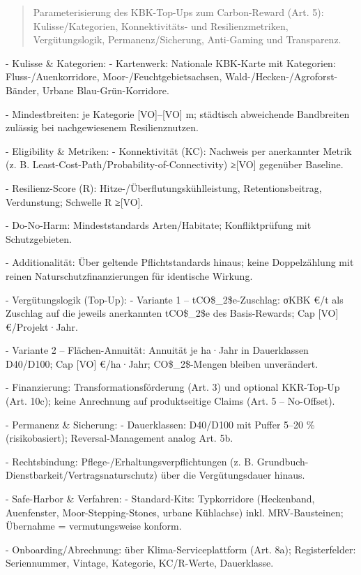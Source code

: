 \documentclass[12pt,a4paper]{scrartcl}
\begin{document}
\begin{quote}
Parameterisierung des KBK-Top-Ups zum Carbon-Reward (Art. 5): Kulisse/Kategorien, Konnektivitäts- und Resilienzmetriken, Vergütungslogik, Permanenz/Sicherung, Anti-Gaming und Transparenz.
\end{quote}

- Kulisse \& Kategorien:
- Kartenwerk: Nationale KBK-Karte mit Kategorien: Fluss-/Auenkorridore, Moor-/Feuchtgebietsachsen, Wald-/Hecken-/Agroforst-Bänder, Urbane Blau-Grün-Korridore.

- Mindestbreiten: je Kategorie [VO]--[VO] m; städtisch abweichende Bandbreiten zulässig bei nachgewiesenem Resilienznutzen.

- Eligibility \& Metriken:
- Konnektivität (KC): Nachweis per anerkannter Metrik (z. B. Least-Cost-Path/Probability-of-Connectivity) ≥[VO] gegenüber Baseline.

- Resilienz-Score (R): Hitze-/Überflutungskühlleistung, Retentionsbeitrag, Verdunstung; Schwelle R ≥[VO].

- Do-No-Harm: Mindeststandards Arten/Habitate; Konfliktprüfung mit Schutzgebieten.

- Additionalität: Über geltende Pflichtstandards hinaus; keine Doppelzählung mit reinen Naturschutzfinanzierungen für identische Wirkung.

- Vergütungslogik (Top-Up):
- Variante 1 -- tCO\$\_2\$e-Zuschlag: σKBK €/t als Zuschlag auf die jeweils anerkannten tCO\$\_2\$e des Basis-Rewards; Cap [VO] €/Projekt·Jahr.

- Variante 2 -- Flächen-Annuität: Annuität je ha·Jahr in Dauerklassen D40/D100; Cap [VO] €/ha·Jahr; CO\$\_2\$-Mengen bleiben unverändert.

- Finanzierung: Transformationsförderung (Art. 3) und optional KKR-Top-Up (Art. 10c); keine Anrechnung auf produktseitige Claims (Art. 5 -- No-Offset).

- Permanenz \& Sicherung:
- Dauerklassen: D40/D100 mit Puffer 5--20 \% (risikobasiert); Reversal-Management analog Art. 5b.

- Rechtsbindung: Pflege-/Erhaltungsverpflichtungen (z. B. Grundbuch-Dienstbarkeit/Vertragsnaturschutz) über die Vergütungsdauer hinaus.

- Safe-Harbor \& Verfahren:
- Standard-Kits: Typkorridore (Heckenband, Auenfenster, Moor-Stepping-Stones, urbane Kühlachse) inkl. MRV-Bausteinen; Übernahme = vermutungsweise konform.

- Onboarding/Abrechnung: über Klima-Serviceplattform (Art. 8a); Registerfelder: Seriennummer, Vintage, Kategorie, KC/R-Werte, Dauerklasse.
\end{document}
